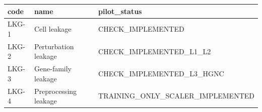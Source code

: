 \begin{tabular}{lll}
\toprule
code & name & pilot_status \\
\midrule
LKG-1 & Cell leakage & CHECK_IMPLEMENTED \\
LKG-2 & Perturbation leakage & CHECK_IMPLEMENTED_L1_L2 \\
LKG-3 & Gene-family leakage & CHECK_IMPLEMENTED_L3_HGNC \\
LKG-4 & Preprocessing leakage & TRAINING_ONLY_SCALER_IMPLEMENTED \\
\bottomrule
\end{tabular}


